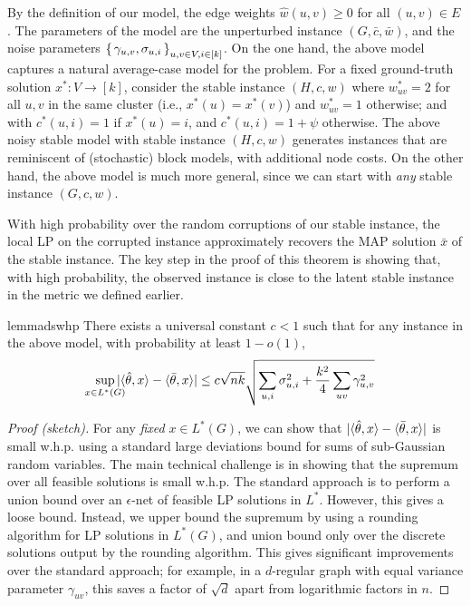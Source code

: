 By the definition of our model, the edge weights $\hat{w}(u,v) \ge 0$ for all $(u,v) \in E$. The parameters of the model are the unperturbed instance $(G,\bar{c},\bar{w})$, and the noise parameters $\set{\gamma_{u,v},\sigma_{u,i}}_{u,v \in V, i \in [k]}$. 
On the one hand, the above model captures a natural average-case model for the problem. For a fixed ground-truth solution $x^*: V \to [k]$, consider the stable instance $(H,c,w)$ where $w^*_{uv}=2$ for all $u,v$ in the same cluster (i.e., $x^*(u) = x^*(v)$) and $w^*_{uv}=1$ otherwise; and with $c^*(u,i)=1$ if $x^*(u)=i$, and $c^*(u,i)=1+\psi$ otherwise. The above noisy stable model with stable instance $(H,c,w)$ generates instances that are reminiscent of (stochastic) block models, with additional node costs. On the other hand, the above model is much more general, since we can start with {\em any} stable instance $(G,c,w)$.   

With high probability over the random corruptions of our stable instance, the local LP on the corrupted instance approximately recovers the MAP solution $\bar{x}$ of the stable instance. The key step in the proof of this theorem is showing that, with high probability, the observed instance is close to the latent stable instance in the metric we defined earlier.

\begin{restatable}{lemma}{dswhp}\label{lem:dswhp}
There exists a universal constant $c < 1$ such that for any instance in the above model, with probability at least $1-o(1)$, 
\begin{equation*}
    \smashoperator{\sup_{x \in L^*(G)}} \abs{\dot{\hat{\theta}}{x}  - \dot{\bar{\theta}}{x}}\le c \sqrt{nk} \sqrt{\sum_{u,i}\sigma_{u,i}^2 + \frac{k^2}{4}\sum_{uv}\gamma_{u,v}^2}
\end{equation*}
\end{restatable}

\begin{proof}[Proof (sketch)]
For any \emph{fixed} $x \in L^*(G)$, we can show that $|\langle \hat{\theta},x\rangle  - \langle \bar{\theta},x\rangle|$ is small w.h.p. using a standard large deviations bound for sums of sub-Gaussian random variables. The main technical challenge is in showing that the supremum over all feasible solutions is small w.h.p. The standard approach is to perform a union bound over an $\epsilon$-net of feasible LP solutions in $L^*$. However, this gives a loose bound. Instead, we upper bound the supremum by using a rounding algorithm for LP solutions in $L^*(G)$, and union bound only over the discrete solutions output by the rounding algorithm. This gives significant improvements over the standard approach; for example, in a $d$-regular graph with equal variance parameter $\gamma_{uv}$, this saves a factor of $\sqrt{d}$ apart from logarithmic factors in $n$.
\end{proof}

